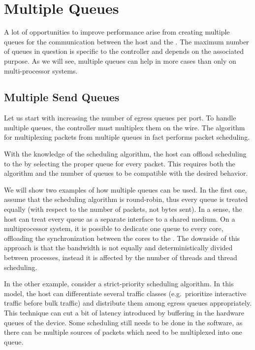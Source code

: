 \section{Multiple Queues}

A lot of opportunities to improve performance arise from creating multiple
queues for the communication between the host and the . The maximum number
of queues in question is specific to the controller and depends on the
associated purpose. As we will see, multiple
queues can help in more cases than only on multi-processor systems.

\subsection{Multiple Send Queues}

Let us start with increasing the number of egress queues per port. To handle
multiple queues, the controller must multiplex them on the wire. The algorithm for
multiplexing packets from multiple queues in fact performs packet scheduling.

With the knowledge of the scheduling algorithm, the host can offload scheduling
to the  by selecting the proper queue for every packet. This requires
both the algorithm and the number of queues to be compatible with the desired
behavior.

We will show two examples of how multiple queues can be used. In the first one, assume that
the scheduling algorithm is round-robin, thus every queue is treated equally
(with respect to the number of packets, not bytes sent). In a sense, the host can
treat every queue as a separate interface to a shared medium. On
a multiprocessor system, it is possible to dedicate one queue to every core,
offloading the synchronization between the cores to the . The downside of
this approach is that the bandwidth is not equally and deterministically divided
between processes, instead it is affected by the number of threads and thread
scheduling.

In the other example, consider a strict-priority scheduling algorithm. In this
model, the host can differentiate several traffic classes (e.g.\ prioritize
interactive traffic before bulk traffic) and distribute them among egress
queues appropriately. This technique can cut a bit of latency introduced by
buffering in the hardware queues of the device. Some scheduling still needs to
be done in the software, as there can be multiple sources of packets which
need to be multiplexed into one queue.

